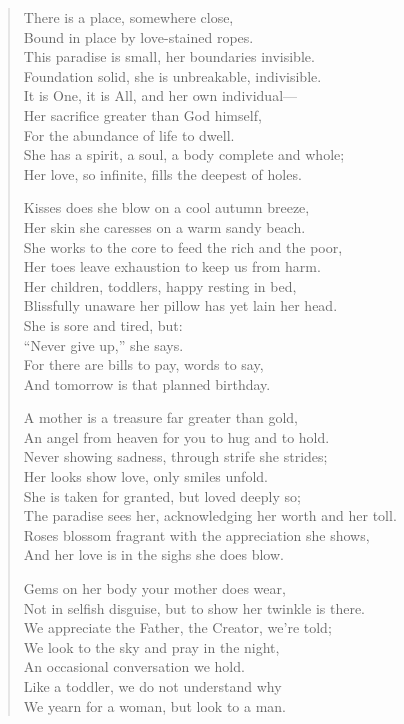 \documentclass[12pt]{amsart}
\begin{document}
\begin{verse}
There is a place, somewhere close,\\
Bound in place by love-stained ropes.\\
This paradise is small, her boundaries invisible.\\
Foundation solid, she is unbreakable, indivisible.\\
It is One, it is All, and her own individual---\\
Her sacrifice greater than God himself,\\
For the abundance of life to dwell.\\
She has a spirit, a soul, a body complete and whole;\\
Her love, so infinite, fills the deepest of holes.

Kisses does she blow on a cool autumn breeze,\\
Her skin she caresses on a warm sandy beach.\\
She works to the core to feed the rich and the poor,\\
Her toes leave exhaustion to keep us from harm.\\
Her children, toddlers, happy resting in bed,\\
Blissfully unaware her pillow has yet lain her head.\\
She is sore and tired, but:\\
``Never give up,'' she says.\\
For there are bills to pay, words to say,\\
And tomorrow is that planned birthday.

A mother is a treasure far greater than gold,\\
An angel from heaven for you to hug and to hold.\\
Never showing sadness, through strife she strides;\\
Her looks show love, only smiles unfold.\\
She is taken for granted, but loved deeply so;\\
The paradise sees her, acknowledging her worth and her toll.\\
Roses blossom fragrant with the appreciation she shows,\\
And her love is in the sighs she does blow.

Gems on her body your mother does wear,\\
Not in selfish disguise, but to show her twinkle is there.\\
We appreciate the Father, the Creator, we’re told;\\
We look to the sky and pray in the night,\\
An occasional conversation we hold.\\
Like a toddler, we do not understand why\\
We yearn for a woman, but look to a man.


\end{verse}
\end{document}
